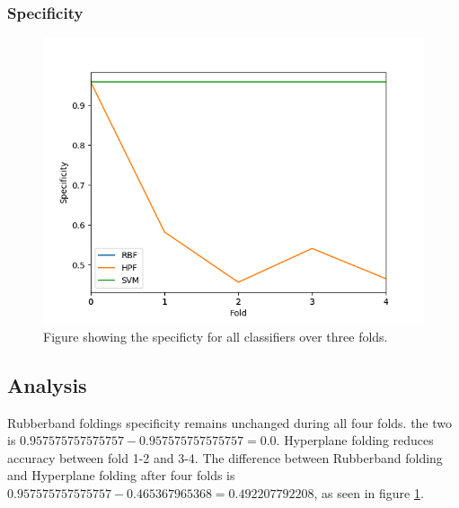 \documentclass[a4paper,twoside]{bth}
\begin{document}
\subsubsection{Specificity}
\begin{figure}[!htb]
\centering
\includegraphics[scale=0.7]{images/result-cancer/Specificity.png}
   \caption{Figure showing the specificty for all classifiers over three folds.}
   \label{fig:cancer-Specificty}
\end{figure}

\FloatBarrier
\subsection{Analysis}
Rubberband foldings specificity remains unchanged during all four folds. the two is $0.957575757575757 - 0.957575757575757 = 0.0$. Hyperplane folding reduces accuracy between fold 1-2 and 3-4. The difference between Rubberband folding and Hyperplane folding after four folds is $0.957575757575757 - 0.465367965368 = 0.492207792208$, as seen in figure \ref{fig:cancer-Specificty}.

\clearpage
\FloatBarrier
\end{document}
